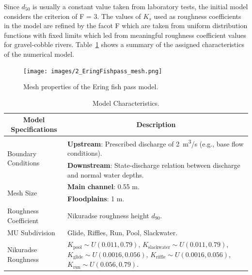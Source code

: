 \documentclass[draft,linenumbers,onecolumn]{agujournal2019} %
\begin{document}
Since \(d_{50}\) is usually a constant value taken from laboratory tests, the initial model considers the criterion of F = 3. The values of \(K_{s}\) used as roughness coefficients in the model are refined by the facot F which are taken from uniform distribution functions with fixed limits which led from meaningful roughness coefficient values for gravel-cobble rivers. Table~\ref{tab:model_characteristics} shows a summary of the assigned characteristics of the numerical model.




\begin{figure}[!htbp]
	\centering
	\texttt{[image: images/2\_EringFishpass\_mesh.png]}
	\caption{Mesh properties of the Ering fish pass model.}
	\label{fig:Mesh}
\end{figure}


\begin{table}[H] 
	\centering
	\caption{Model Characteristics.}
	\begin{tabular}{p{4cm} p{10cm}}
		\hline
		\multicolumn{1}{c}{\textbf{Model Specifications}} & \multicolumn{1}{c}{\textbf{Description}} \\ \hline
		\multirow{2}{4cm}{Boundary Conditions} & \textbf{Upstream}: Prescribed discharge of 2~m\textsuperscript{3}/s (e.g., base flow conditions). \\ 
		& \textbf{Downstream}: State-discharge relation between discharge and normal water depths. \\ \hline
		\multirow{2}{4cm}{Mesh Size} & \textbf{Main channel}: 0.55 m. \\ 
		& \textbf{Floodplains}: 1 m. \\ \hline
		Roughness Coefficient & Nikuradse roughness height \(d_{90}\). \\ \hline
		MU Subdivision & Glide, Riffles, Run, Pool, Slackwater. \\ \hline
		Nikuradse Roughness & \( K_{\text{pool}} \sim U(0.011, 0.79) \), 
		\( K_{\text{slackwater}} \sim U(0.011, 0.79) \), 
		\( K_{\text{glide}} \sim U(0.0016, 0.056) \), 
		\( K_{\text{riffle}} \sim U(0.0016, 0.056) \), 
		\( K_{\text{run}} \sim U(0.056, 0.79) \). \\ \hline
	\end{tabular}
	\label{tab:model_characteristics}
\end{table}
 \vspace{-20pt}      
\FloatBarrier
\end{document}
